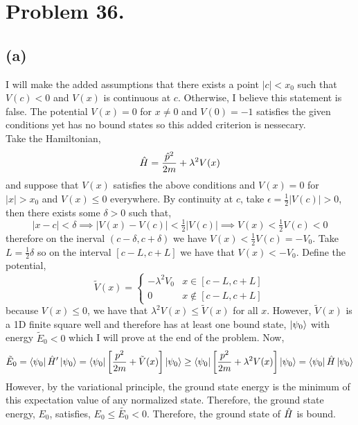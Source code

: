 \documentclass[12pt]{extarticle}
\begin{document}
\section*{Problem 36.}

\subsection*{(a)}
I will make the added assumptions that there exists a point $|c| < x_0$ such that $V(c) < 0$ and $V(x)$ is continuous at $c$. Otherwise, I believe this statement is false. The potential $V(x) = 0$ for $x \neq 0$ and $V(0) = -1$ satisfies the given conditions yet has no bound states so this added criterion is nessecary. \bigskip \\
Take the Hamiltonian,
\[\hat{H} = \frac{\hat{p}^2}{2m} + \lambda^2 V(x)\]
and suppose that $V(x)$ satisfies the above conditions and $V(x) = 0$ for $|x| > x_0$ and $V(x) \le 0$ everywhere. By continuity at $c$, take $\epsilon = \tfrac{1}{2}|V(c)| > 0$, then there exists some $\delta > 0$ such that,
\[|x - c| < \delta \implies |V(x) - V(c)| < \tfrac{1}{2} |V(c)| \implies V(x) < \tfrac{1}{2} V(c) < 0 \]
therefore on the inerval $(c - \delta, c + \delta)$ we have $V(x) < \tfrac{1}{2}V(c) = -V_0$. Take $L = \tfrac{1}{2} \delta$ so on the interval $[c - L, c + L]$ we have that $V(x) < - V_0$. Define the potential,
\[\tilde{V}(x) = \begin{cases}
-\lambda ^2 V_0 & x \in [c - L, c + L] \\
0 & x \notin [c - L, c + L] 
\end{cases}\] 
because $V(x) \le 0$, we have that $\lambda^2 V(x) \le \tilde{V}(x)$ for all $x$. However, $\tilde{V}(x)$ is a 1D finite square well and therefore has at least one bound state, $\left| \psi_0 \right>$ with energy $\tilde{E}_0 < 0$ which I will prove at the end of the problem. Now, 
\[ \tilde{E}_0 = \left< \psi_0 \right| \hat{H}' \left| \psi_0 \right> = \left< \psi_0 \right| \left[ \frac{p^2}{2m} + \tilde{V}(x) \right] \left| \psi_0 \right> \ge \left< \psi_0 \right| \left[ \frac{p^2}{2m} + \lambda^2 V(x) \right] \left| \psi_0 \right>  = \left< \psi_0 \right| \hat{H} \left| \psi_0 \right> \]
However, by the variational principle, the ground state energy is the minimum of this expectation value of any normalized state. Therefore, the ground state energy, $E_0$, satisfies, $E_0 \le \tilde{E_0} < 0$. Therefore, the ground state of $\hat{H}$ is bound.  
\end{document}
